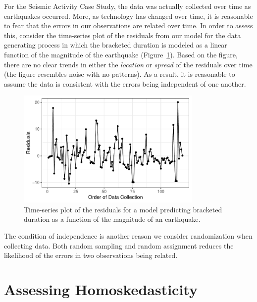 \documentclass[
  letterpaper,
  DIV=11,
  numbers=noendperiod]{scrreprt}
\theoremstyle{definition}
\theoremstyle{definition}
\theoremstyle{plain}
\theoremstyle{remark}
\begin{document}
For the Seismic Activity Case Study, the data was actually collected
over time as earthquakes occurred. More, as technology has changed over
time, it is reasonable to fear that the errors in our observations are
related over time. In order to assess this, consider the time-series
plot of the residuals from our model for the data generating process in
which the bracketed duration is modeled as a linear function of the
magnitude of the earthquake
(Figure~\ref{fig-regassessment-independence}). Based on the figure,
there are no clear trends in either the \emph{location} or \emph{spread}
of the residuals over time (the figure resembles noise with no
patterns). As a result, it is reasonable to assume the data is
consistent with the errors being independent of one another.

\begin{figure}

{\centering \includegraphics[width=0.8\textwidth,height=\textheight]{./images/fig-regassessment-independence-1.pdf}

}

\caption{\label{fig-regassessment-independence}Time-series plot of the
residuals for a model predicting bracketed duration as a function of the
magnitude of an earthquake.}

\end{figure}

The condition of independence is another reason we consider
randomization when collecting data. Both random sampling and random
assignment reduces the likelihood of the errors in two observations
being related.

\hypertarget{assessing-homoskedasticity}{%
\section{Assessing Homoskedasticity}\label{assessing-homoskedasticity}}
\end{document}
